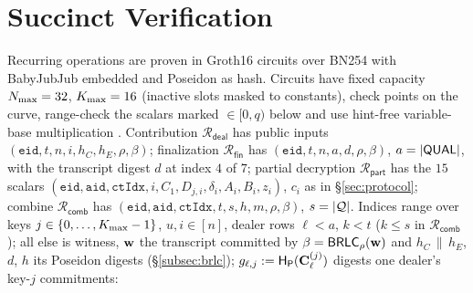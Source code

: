 \providecommand{\Rel}[1]{\mathcal{R}_{\mathsf{#1}}}
\section{Succinct Verification}
\label{sec:succinct}
\label{subsec:relations}

Recurring operations are proven in Groth16 circuits \cite{groth16} over BN254 with BabyJubJub embedded and Poseidon \cite{grassi2021poseidon} as hash. Circuits have fixed capacity $N_{\max} = 32$, $K_{\max} = 16$ (inactive slots masked to constants), check points on the curve, range-check the scalars marked $\in[0,q)$ below and use hint-free variable-base multiplication \cite{hisil2008twisted}. Contribution $\Rel{deal}$ has public inputs $(\mathtt{eid}, t, n, i, h_C, h_E, \rho, \beta)$; finalization $\Rel{fin}$ has $(\mathtt{eid}, t, n, a, d, \rho, \beta)$, $a = |\mathsf{QUAL}|$, with the transcript digest $d$ at index $4$ of $7$; partial decryption $\Rel{part}$ has the $15$ scalars $(\mathtt{eid}, \mathtt{aid}, \mathtt{ctIdx}, i, C_1, D_{j,i}, \delta_i, A_i, B_i, z_i)$, $c_i$ as in \S\ref{sec:protocol}; combine $\Rel{comb}$ has $(\mathtt{eid}, \mathtt{aid}, \mathtt{ctIdx}, t, s, h, m, \rho, \beta)$, $s = |\mathcal{Q}|$. Indices range over keys $j \in \{0, \dots, K_{\max}-1\}$, $u, i \in [n]$, dealer rows $\ell < a$, $k < t$ ($k \le s$ in $\Rel{comb}$); all else is witness, $\mathbf{w}$ the transcript committed by $\beta = \mathsf{BRLC}_\rho(\mathbf{w})$ and $h_C\,\|\,h_E$, $d$, $h$ its Poseidon digests (\S\ref{subsec:brlc}); $g_{\ell,j} := \mathsf{H}_{\mathsf{P}}(\mathbf{C}_\ell^{(j)})$ digests one dealer's key-$j$ commitments:
